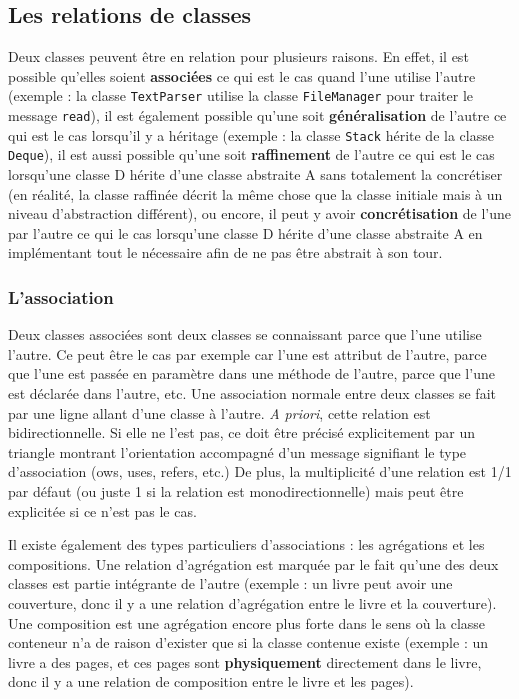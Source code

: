 \documentclass{article}
\begin{document}
	\subsection{Les relations de classes}
		Deux classes peuvent être en relation pour plusieurs raisons. En effet, il est possible qu'elles soient \textbf{associées} ce qui est le cas quand l'une utilise l'autre (exemple :
		la classe \texttt{TextParser} utilise la classe \texttt{FileManager} pour traiter le message \texttt{read}), il est également possible qu'une soit \textbf{généralisation} de
		l'autre ce qui est le cas lorsqu'il y a héritage (exemple : la classe \texttt{Stack} hérite de la classe \texttt{Deque}), il est aussi possible qu'une soit \textbf{raffinement}
		de l'autre ce qui est le cas lorsqu'une classe D hérite d'une classe abstraite A sans totalement la concrétiser (en réalité, la classe raffinée décrit la même chose que la classe
		initiale mais à un niveau d'abstraction différent), ou encore, il peut y avoir \textbf{concrétisation} de l'une par l'autre ce qui le cas lorsqu'une classe D hérite d'une classe
		abstraite A en implémentant tout le nécessaire afin de ne pas être abstrait à son tour.

		\subsubsection{L'association}
			Deux classes associées sont deux classes se connaissant parce que l'une utilise l'autre. Ce peut être le cas par exemple car l'une est attribut de l'autre, parce que l'une
			est passée en paramètre dans une méthode de l'autre, parce que l'une est déclarée dans l'autre, etc. Une association normale entre deux classes se fait par une ligne allant d'une classe à
			l'autre. \textit{A priori}, cette relation est bidirectionnelle. Si elle ne l'est pas, ce doit être précisé explicitement par un triangle montrant l'orientation accompagné d'un
			message signifiant le type d'association (ows, uses, refers, etc.) De plus, la multiplicité d'une relation est 1/1 par défaut (ou juste 1 si la relation est monodirectionnelle)
			mais peut être explicitée si ce n'est pas le cas.

			Il existe également des types particuliers d'associations : les agrégations et les compositions. Une relation d'agrégation est marquée par le fait qu'une des deux classes est
			partie intégrante de l'autre (exemple : un livre peut avoir une couverture, donc il y a une relation d'agrégation entre le livre et la couverture). Une composition est une agrégation
			encore plus forte dans le sens où la classe conteneur n'a de raison d'exister que si la classe contenue existe (exemple : un livre a des pages, et ces pages sont \textbf{physiquement}
			directement dans le livre, donc il y a une relation de composition entre le livre et les pages).
			
\end{document}

